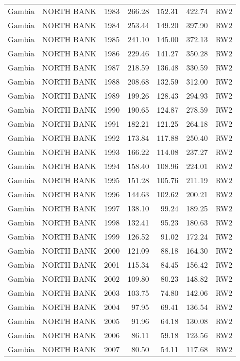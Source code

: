 \begin{longtable}{lllrrrl}
  Gambia & NORTH BANK & 1983 & 266.28 & 152.31 & 422.74 & RW2 \\ 
  Gambia & NORTH BANK & 1984 & 253.44 & 149.20 & 397.90 & RW2 \\ 
  Gambia & NORTH BANK & 1985 & 241.10 & 145.00 & 372.13 & RW2 \\ 
  Gambia & NORTH BANK & 1986 & 229.46 & 141.27 & 350.28 & RW2 \\ 
  Gambia & NORTH BANK & 1987 & 218.59 & 136.48 & 330.59 & RW2 \\ 
  Gambia & NORTH BANK & 1988 & 208.68 & 132.59 & 312.00 & RW2 \\ 
  Gambia & NORTH BANK & 1989 & 199.26 & 128.43 & 294.93 & RW2 \\ 
  Gambia & NORTH BANK & 1990 & 190.65 & 124.87 & 278.59 & RW2 \\ 
  Gambia & NORTH BANK & 1991 & 182.21 & 121.25 & 264.18 & RW2 \\ 
  Gambia & NORTH BANK & 1992 & 173.84 & 117.88 & 250.40 & RW2 \\ 
  Gambia & NORTH BANK & 1993 & 166.22 & 114.08 & 237.27 & RW2 \\ 
  Gambia & NORTH BANK & 1994 & 158.40 & 108.96 & 224.01 & RW2 \\ 
  Gambia & NORTH BANK & 1995 & 151.28 & 105.76 & 211.19 & RW2 \\ 
  Gambia & NORTH BANK & 1996 & 144.63 & 102.62 & 200.21 & RW2 \\ 
  Gambia & NORTH BANK & 1997 & 138.10 & 99.24 & 189.25 & RW2 \\ 
  Gambia & NORTH BANK & 1998 & 132.41 & 95.23 & 180.63 & RW2 \\ 
  Gambia & NORTH BANK & 1999 & 126.52 & 91.02 & 172.24 & RW2 \\ 
  Gambia & NORTH BANK & 2000 & 121.09 & 88.18 & 164.30 & RW2 \\ 
  Gambia & NORTH BANK & 2001 & 115.34 & 84.45 & 156.42 & RW2 \\ 
  Gambia & NORTH BANK & 2002 & 109.80 & 80.23 & 148.82 & RW2 \\ 
  Gambia & NORTH BANK & 2003 & 103.75 & 74.80 & 142.06 & RW2 \\ 
  Gambia & NORTH BANK & 2004 & 97.95 & 69.41 & 136.54 & RW2 \\ 
  Gambia & NORTH BANK & 2005 & 91.96 & 64.18 & 130.08 & RW2 \\ 
  Gambia & NORTH BANK & 2006 & 86.11 & 59.18 & 123.56 & RW2 \\ 
  Gambia & NORTH BANK & 2007 & 80.50 & 54.11 & 117.68 & RW2 \\ 

\end{longtable}
